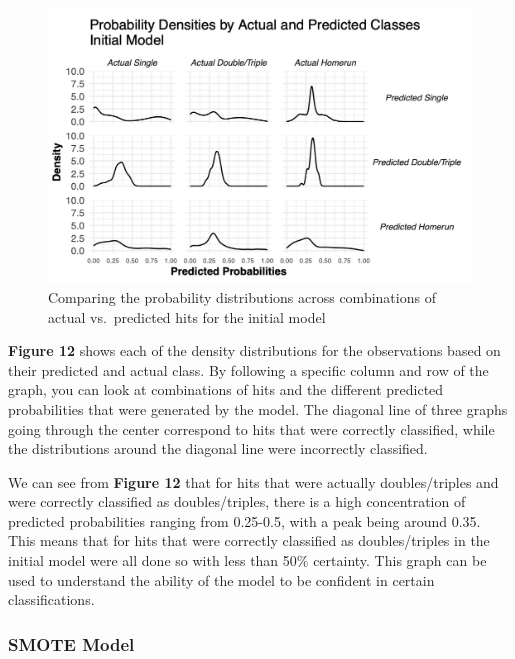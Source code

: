\documentclass[
  letterpaper,
  DIV=11,
  numbers=noendperiod]{scrartcl}
\begin{document}
\begin{figure}[H]

{\centering \includegraphics{./images/figures/fig12.png}

}

\caption{Comparing the probability distributions across combinations of
actual vs.~predicted hits for the initial model}

\end{figure}%

\textbf{Figure 12} shows each of the density distributions for the
observations based on their predicted and actual class. By following a
specific column and row of the graph, you can look at combinations of
hits and the different predicted probabilities that were generated by
the model. The diagonal line of three graphs going through the center
correspond to hits that were correctly classified, while the
distributions around the diagonal line were incorrectly classified.

We can see from \textbf{Figure 12} that for hits that were actually
doubles/triples and were correctly classified as doubles/triples, there
is a high concentration of predicted probabilities ranging from
0.25-0.5, with a peak being around 0.35. This means that for hits that
were correctly classified as doubles/triples in the initial model were
all done so with less than 50\% certainty. This graph can be used to
understand the ability of the model to be confident in certain
classifications.

\subsubsection{SMOTE Model}\label{smote-model-1}
\end{document}
